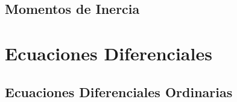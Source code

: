 		\section{Momentos de Inercia} %
		\label{sec:momentos_de_inercia}
			
	\chapter{Ecuaciones Diferenciales} %
	\label{cha:ecuaciones_diferenciales}
		\section{Ecuaciones Diferenciales Ordinarias} %
		\label{sec:ecuaciones_diferenciales_ordinarias}
			
